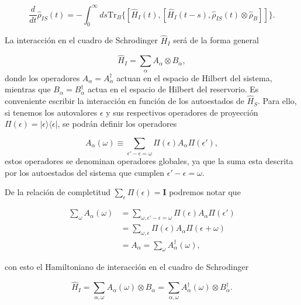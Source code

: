 \begin{equation}
    \frac{d}{dt}\hat{\rho}_{IS}(t) = -  \int_{0}^{\infty}ds \text{Tr}_{B}\{[\hat{H}_{I}(t), [\hat{H}_{I}(t-s),\hat{\rho}_{IS}(t) \otimes \hat{\rho}_{B}]]\}.
    \label{eq3sec2:markov1}
\end{equation} 

La interacción en el cuadro de Schrodinger $\hat{H}_{I}$ será de la forma general

\begin{equation*}
    \hat{H}_{I} = \sum_{\alpha}A_{\alpha} \otimes B_{\alpha},
\end{equation*}
donde los operadores $A_{\alpha} = A^{\dagger}_{\alpha}$ actuan en el espacio de Hilbert del sistema, mientras que $B_{\alpha}=B^{\dagger}_{\alpha}$ actua en el espacio de Hilbert del reservorio. Es conveniente escribir la interacción en función de los autoestados de $\hat{H}_{S}$. Para ello, si tenemos los autovalores $\epsilon$ y sus respectivos operadores de proyección $\Pi(\epsilon) = |\epsilon\rangle \langle \epsilon|$, se podrán definir los operadores

\begin{equation}
    A_{\alpha}(\omega) \equiv \sum_{\epsilon' - \epsilon = \omega}\Pi(\epsilon)A_{\alpha}\Pi(\epsilon'), 
    \label{sec1:globalA}
\end{equation}
estos operadores se denominan operadores globales, ya que la suma esta descrita por los autoestados del sistema que cumplen $\epsilon'-\epsilon=\omega$. 

De la relación de completitud $\sum_{\epsilon}\Pi(\epsilon) = \mathbf{I}$ podremos notar que

\begin{align*}
   \sum_{\omega}A_{\alpha}(\omega) & =  \sum_{\omega,\epsilon'-\epsilon  = \omega} \Pi(\epsilon) A_{\alpha} \Pi(\epsilon') \\
   & = \sum_{\omega,\epsilon} \Pi(\epsilon) A_{\alpha} \Pi(\epsilon + \omega) \\
   & = A_{\alpha} = \sum_{\omega}A^{\dagger}_{\alpha}(\omega),
\end{align*}

con esto el Hamiltoniano de interacción en el cuadro de Schrodinger

\begin{equation*}
    \hat{H}_{I} = \sum_{\alpha,\omega}A_{\alpha}(\omega) \otimes B_{\alpha} = \sum_{\alpha,\omega}A^{\dagger}_{\alpha}(\omega) \otimes B^{\dagger}_{\alpha}.
\end{equation*}

